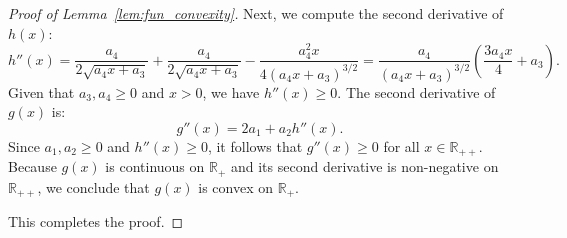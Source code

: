 \documentclass[10pt,a4paper]{amsart}
\begin{document}
\begin{proof}[Proof of Lemma~\ref{lem:fun_convexity}]
		Next, we compute the second derivative of $h(x)$:
		\begin{equation*}
			h''(x) = \frac{a_4}{2\sqrt{a_4 x + a_3}} + \frac{a_4}{2\sqrt{a_4 x + a_3}} - \frac{a_4^2 x}{4(a_4 x + a_3)^{3/2}} = \frac{a_4}{(a_4 x + a_3)^{3/2}} \left( \frac{3a_4 x}{4} + a_3 \right).
		\end{equation*}
		Given that $a_3, a_4 \geq 0$ and $x > 0$, we have $h''(x) \geq 0$. 
		The second derivative of $g(x)$ is:
		\begin{equation*}
			g''(x) = 2a_1 + a_2 h''(x).
		\end{equation*}
		Since $a_1, a_2 \geq 0$ and $h''(x) \geq 0$, it follows that $g''(x) \geq 0$ for all $x \in \mathbb{R}_{++}$. 
		Because $g(x)$ is continuous on $\mathbb{R}_{+}$ and its second derivative is non-negative on $\mathbb{R}_{++}$, we conclude that $g(x)$ is convex on $\mathbb{R}_{+}$.
		
		This completes the proof.
	\end{proof}
\end{document}
